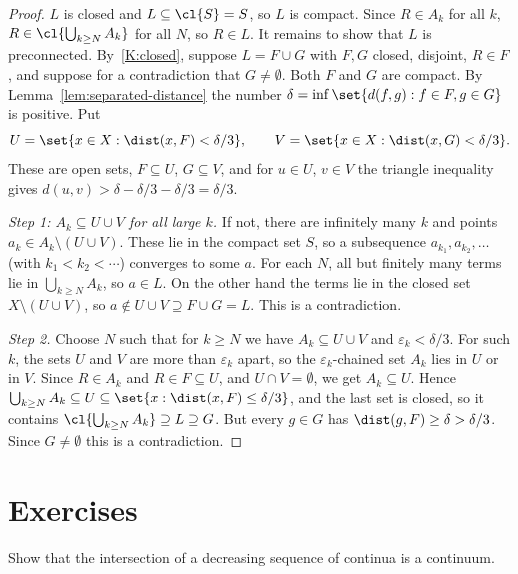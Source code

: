 \begin{proof}
$L$ is closed and $L\subseteq\cl{S}=S$, so $L$ is compact. Since $R\in A_k$ for all $k$, $R\in
\cl{\bigcup_{k\ge N}A_k}$ for all $N$, so $R\in L$. It remains to show that $L$ is
preconnected. By~\ref{K:closed}, suppose $L=F\cup G$ with $F,G$ closed, disjoint, $R\in F$, and
suppose for a contradiction that $G\neq\emptyset$. Both $F$ and $G$ are compact. By
Lemma~\ref{lem:separated-distance} the number
$\delta=\inf\set{d(f,g):f\in F,g\in G}$ is positive. Put
\[
U=\set{x\in X:\dist(x,F)<\delta/3},\qquad V=\set{x\in X:\dist(x,G)<\delta/3}.
\]
These are open sets, $F\subseteq U$, $G\subseteq V$, and for $u\in U$, $v\in V$ the triangle
inequality gives $d(u,v)>\delta-\delta/3-\delta/3=\delta/3$.

\emph{Step 1: $A_k\subseteq U\cup V$ for all large $k$.} If not, there are infinitely many
$k$ and points $a_k\in A_k\setminus(U\cup V)$. These lie in the compact set $S$, so a
subsequence $a_{k_1},a_{k_2},\dots$ (with $k_1<k_2<\cdots$) converges to some $a$. For each
$N$, all but finitely many terms lie in $\bigcup_{k\ge N}A_k$, so $a\in L$. On the other hand
the terms lie in the closed set $X\setminus(U\cup V)$, so $a\notin U\cup V\supseteq F\cup G=L$.
This is a contradiction.

\emph{Step 2.} Choose $N$ such that for $k\ge N$ we have $A_k\subseteq U\cup V$ and
$\varepsilon_k<\delta/3$. For such $k$, the sets $U$ and $V$ are more than $\varepsilon_k$
apart, so the $\varepsilon_k$-chained set $A_k$ lies in $U$ or in $V$. Since $R\in A_k$ and
$R\in F\subseteq U$, and $U\cap V=\emptyset$, we get $A_k\subseteq U$. Hence
$\bigcup_{k\ge N}A_k\subseteq U\subseteq\set{x:\dist(x,F)\le\delta/3}$, and the last set is
closed, so it contains $\cl{\bigcup_{k\ge N}A_k}\supseteq L\supseteq G$. But every $g\in G$
has $\dist(g,F)\ge\delta>\delta/3$. Since $G\neq\emptyset$ this is a contradiction.
\end{proof}


\section*{Exercises}

\begin{exercise}
Show that the intersection of a decreasing sequence of continua is a continuum.
\end{exercise}

